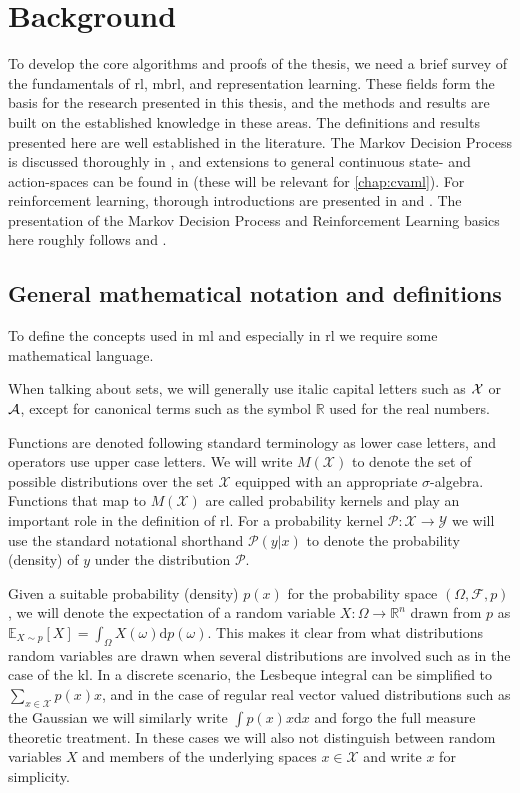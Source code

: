 \chapter{Background}
\label{chap:background}


To develop the core algorithms and proofs of the thesis, we need a brief survey of the fundamentals of \ac{rl}, \ac{mbrl}, and representation learning.
These fields form the basis for the research presented in this thesis, and the methods and results are built on the established knowledge in these areas.
The definitions and results presented here are well established in the literature.
The Markov Decision Process is discussed thoroughly in \parencite{puterman1994markov}, and extensions to general continuous state- and action-spaces can be found in \textcite{bertsekasshreve1978} (these will be relevant for \autoref{chap:cvaml}).
For reinforcement learning, thorough introductions are presented in \textcite{suttonbook} and \textcite{farahmand2021}.
The presentation of the Markov Decision Process and Reinforcement Learning basics here roughly follows \textcite{farahmand2011thesis} and \textcite{farahmand2021}.


\section{General mathematical notation and definitions}
To define the concepts used in \ac{ml} and especially in \ac{rl} we require some mathematical language.

When talking about sets, we will generally use italic capital letters such as $\mathcal{X}$ or $\mathcal{A}$, except for canonical terms such as the symbol $\mathbb{R}$ used for the real numbers.

Functions are denoted following standard terminology as lower case letters, and operators use upper case letters.
We will write $M(\mathcal{X})$ to denote the set of possible distributions over the set $\mathcal{X}$ equipped with an appropriate $\sigma$-algebra.
Functions that map to $M(\mathcal{X})$ are called probability kernels and play an important role in the definition of \ac{rl}.
For a probability kernel $\mathcal{P}: \mathcal{X} \rightarrow \mathcal{Y}$ we will use the standard notational shorthand $\mathcal{P}(y|x)$ to denote the probability (density) of $y$ under the distribution $\mathcal{P}$.

Given a suitable probability (density) $p(x)$ for the probability space $(\Omega,\mathcal{F},p)$, we will denote the expectation of a random variable $X: \Omega \rightarrow \mathbb{R}^n$ drawn from $p$ as $\mathbb{E}_{X \sim p}\left[X\right] = \int_{\Omega} X(\omega) \mathrm{d} p(\omega)$.
This makes it clear from what distributions random variables are drawn when several distributions are involved such as in the case of the \ac{kl}.
In a discrete scenario, the Lesbeque integral can be simplified to $\sum_{x \in \mathcal{X}} p(x) x$, and in the case of regular real vector valued distributions such as the Gaussian we will similarly write $\int p(x) x \mathrm{d} x$ and forgo the full measure theoretic treatment.
In these cases we will also not distinguish between random variables $X$ and members of the underlying spaces $x \in \mathcal{X}$ and write $x$ for simplicity.


